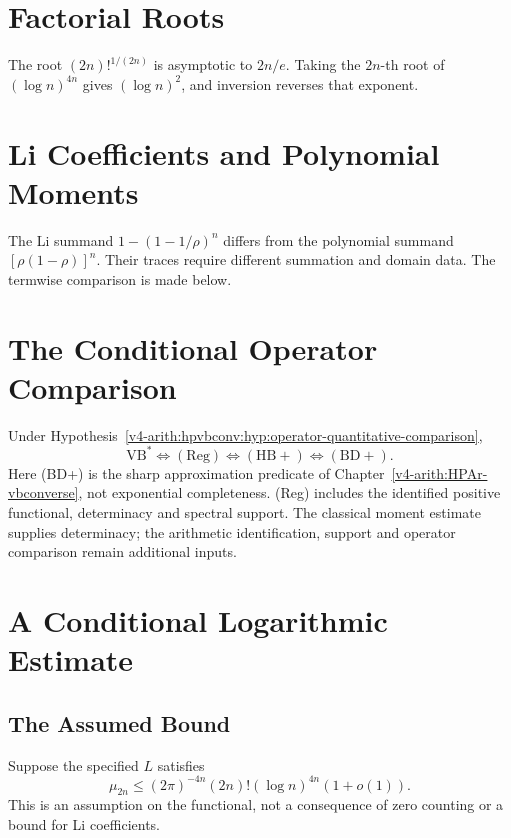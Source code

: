 \section{Factorial Roots}
\label{v4-arith:r-comparison:stirling-error}
The root \((2n)!^{1/(2n)}\) is asymptotic to \(2n/e\).
Taking the \(2n\)-th root of \((\log n)^{4n}\) gives
\((\log n)^2\), and inversion reverses that exponent.

\section{Li Coefficients and Polynomial Moments}
\label{v4-arith:r-comparison:BL-lambda-not-mu}
The Li summand \(1-(1-1/\rho)^n\) differs from the polynomial
summand \([\rho(1-\rho)]^n\). Their traces require different
summation and domain data. The termwise comparison is made below.

\section{The Conditional Operator Comparison}
\label{v4-arith:r-comparison:chain-position}
Under Hypothesis~\ref{v4-arith:hpvbconv:hyp:operator-quantitative-comparison},
\[
 \mathrm{VB}^{*}\Longleftrightarrow(\mathrm{Reg})
 \Longleftrightarrow(\mathrm{HB+})\Longleftrightarrow(\mathrm{BD+}).
\]
Here (BD+) is the sharp approximation predicate of
Chapter~\ref{v4-arith:HPAr-vbconverse}, not exponential completeness.
(Reg) includes the identified positive functional, determinacy and
spectral support. The classical moment estimate supplies determinacy;
the arithmetic identification, support and operator comparison remain
additional inputs.

\section{A Conditional Logarithmic Estimate}
\label{v4-arith:r-comparison:carleman-BL-explicit}
\subsection{The Assumed Bound}
\label{v4-arith:r-comparison:upper-bound}
Suppose the specified \(L\) satisfies
\begin{equation}
\label{v4-arith:r-comparison:eq:upper-bound}
 \mu_{2n}\leq(2\pi)^{-4n}(2n)!(\log n)^{4n}(1+o(1)).
\end{equation}
This is an assumption on the functional, not a consequence of
zero counting or a bound for Li coefficients.
